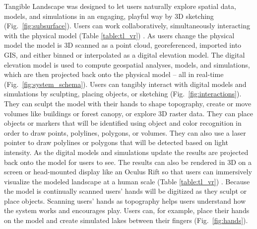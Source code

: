 \documentclass[prodmode,acmtochi]{acmsmall} %
\begin{document}
Tangible Landscape was designed to let users naturally explore 
spatial data, models, and simulations in an engaging, playful way
by 3D sketching (Fig.~\ref{fig:subsurface}). 
Users can work collaboratively, 
simultaneously interacting with the physical model
(Table \ref{table:tl_vr}) \cite{Tabrizian2016}. 
As users change the physical model
the model is 3D scanned as a point cloud, georeferenced, imported into GIS, 
and either binned or interpolated as a digital elevation model. 
The digital elevation model is used to compute 
geospatial analyses, models, and simulations, 
which are then projected back onto the physical model 
-- all in real-time (Fig.~\ref{fig:system_schema}). 
Users can tangibly interact with digital models and simulations
by sculpting, placing objects, or sketching (Fig.~\ref{fig:interactions}).
They can sculpt the model with their hands
to shape topography, 
create or move volumes
like buildings or forest canopy, 
or explore 3D raster data.  
They can place objects or markers 
that will be identified using object and color recognition
in order to draw points, polylines, polygons, or volumes. 
They can also use a laser pointer to draw polylines or polygons
that will be detected based on light intensity. 
As the digital models and simulations update
the results are projected back onto the model for users to see. 
The results can also be rendered in 3D 
on a screen or head-mounted display like an Oculus Rift
so that users can immersively visualize the modeled landscape 
at a human scale 
(Table \ref{table:tl_vr}) \cite{Tabrizian2016}.
%
Because the model is continually scanned
users' hands will be digitized as they sculpt or place objects. 
Scanning users' hands as topography 
helps users understand how the system works
and encourages play. 
Users can, for example, 
place their hands on the model and create simulated lakes between their fingers
(Fig.~\ref{fig:hands}). %
\end{document}
